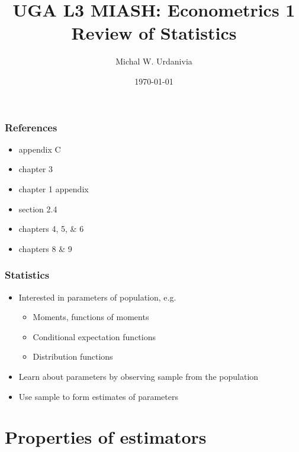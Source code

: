 
\title[Econometrics 1: Statistics]{UGA L3 MIASH: Econometrics 1\\
  \textbf{Review of Statistics}}
\date{\today}
\author{Michal W. Urdanivia\inst{*}}




\frame{\titlepage}

\begin{frame}
  \tableofcontents  
\end{frame}

\begin{frame}\frametitle{References}
  \begin{itemize}
  \item \cite{w2013} appendix C
  \item \cite{sw2009} chapter 3
  \item \cite{ap2014} chapter 1 appendix
  \item \cite{abbring2001} section 2.4
  \item \cite{dbc2012} chapters 4, 5, \& 6
  \item \cite{gs2003} chapters 8 \& 9
  \end{itemize}
\end{frame}

\begin{frame}
  \frametitle{Statistics}
  \begin{itemize}
  \item Interested in \alert{parameters} of population, e.g.\
    \begin{itemize}
    \item Moments, functions of moments
    \item Conditional expectation functions
    \item Distribution functions      
    \end{itemize}
  \item Learn about parameters by observing sample from the population    
  \item Use sample to form estimates of parameters
  \end{itemize}
\end{frame}

\section{Properties of estimators}
